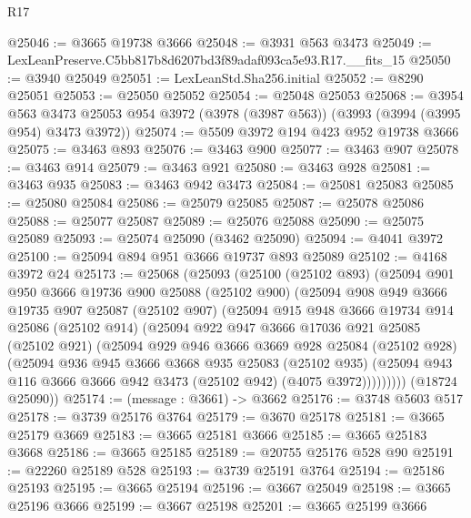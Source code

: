 \begin{lexlean}{R17}
\begin{coremodule}
@25046 := @3665 @19738 @3666
@25048 := @3931 @563 @3473
@25049 := LexLeanPreserve.C5bb817b8d6207bd3f89adaf093ca5e93.R17.__fits_15
@25050 := @3940 @25049
@25051 := LexLeanStd.Sha256.initial
@25052 := @8290 @25051
@25053 := @25050 @25052
@25054 := @25048 @25053
@25068 := @3954
    @563
    @3473
    @25053
    @954
    @3972
    (@3978 (@3987 @563))
    (@3993 (@3994 (@3995 @954) @3473 @3972))
@25074 := @5509 @3972 @194 @423 @952 @19738 @3666
@25075 := @3463 @893
@25076 := @3463 @900
@25077 := @3463 @907
@25078 := @3463 @914
@25079 := @3463 @921
@25080 := @3463 @928
@25081 := @3463 @935
@25083 := @3463 @942 @3473
@25084 := @25081 @25083
@25085 := @25080 @25084
@25086 := @25079 @25085
@25087 := @25078 @25086
@25088 := @25077 @25087
@25089 := @25076 @25088
@25090 := @25075 @25089
@25093 := @25074 @25090 (@3462 @25090)
@25094 := @4041 @3972
@25100 := @25094 @894 @951 @3666 @19737 @893 @25089
@25102 := @4168 @3972 @24
@25173 := @25068
    (@25093
      (@25100
        (@25102 @893)
        (@25094
          @901
          @950
          @3666
          @19736
          @900
          @25088
          (@25102 @900)
          (@25094
            @908
            @949
            @3666
            @19735
            @907
            @25087
            (@25102 @907)
            (@25094
              @915
              @948
              @3666
              @19734
              @914
              @25086
              (@25102 @914)
              (@25094
                @922
                @947
                @3666
                @17036
                @921
                @25085
                (@25102 @921)
                (@25094
                  @929
                  @946
                  @3666
                  @3669
                  @928
                  @25084
                  (@25102 @928)
                  (@25094
                    @936
                    @945
                    @3666
                    @3668
                    @935
                    @25083
                    (@25102 @935)
                    (@25094 @943 @116 @3666 @3666 @942 @3473 (@25102 @942) (@4075 @3972)))))))))
      (@18724 @25090))
@25174 := (message : @3661) -> @3662
@25176 := @3748 @5603 @517
@25178 := @3739 @25176 @3764
@25179 := @3670 @25178
@25181 := @3665 @25179 @3669
@25183 := @3665 @25181 @3666
@25185 := @3665 @25183 @3668
@25186 := @3665 @25185
@25189 := @20755 @25176 @528 @90
@25191 := @22260 @25189 @528
@25193 := @3739 @25191 @3764
@25194 := @25186 @25193
@25195 := @3665 @25194
@25196 := @3667 @25049
@25198 := @3665 @25196 @3666
@25199 := @3667 @25198
@25201 := @3665 @25199 @3666

\end{coremodule}
\end{lexlean}
